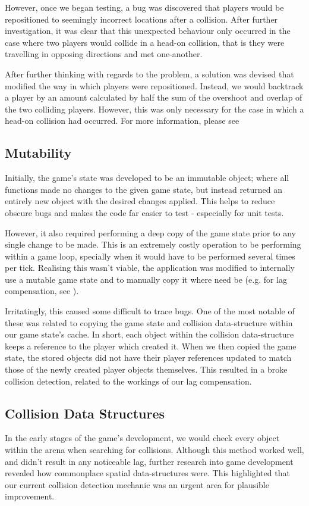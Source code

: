 \documentclass{standalone}
\begin{document}
			However, once we began testing, a bug was discovered that players would be repositioned to seemingly incorrect locations after a collision. After further investigation, it was clear that this unexpected behaviour only occurred in the case where two players would collide in a head-on collision, that is they were travelling in opposing directions and met one-another.

			After further thinking with regards to the problem, a solution was devised that modified the way in which players were repositioned. Instead, we would backtrack a player by an amount calculated by half the sum of the overshoot and overlap of the two colliding players. However, this was only necessary for the case in which a head-on collision had occurred. For more information, please see 

		\subsection{Mutability}
			Initially, the game's state was developed to be an immutable object; where all functions made no changes to the given game state, but instead returned an entirely new object with the desired changes applied. This helps to reduce obscure bugs and makes the code far easier to test - especially for unit tests.

			However, it also required performing a deep copy of the game state prior to any single change to be made. This is an extremely costly operation to be performing within a game loop, specially when it would have to be performed several times per tick. Realising this wasn't viable, the application was modified to internally use a mutable game state and to manually copy it where need be (e.g. for lag compensation, see ).

			Irritatingly, this caused some difficult to trace bugs. One of the most notable of these was related to copying the game state and collision data-structure within our game state's cache. In short, each object within the collision data-structure keeps a reference to the player which created it. When we then copied the game state, the stored objects did not have their player references updated to match those of the newly created player objects themselves. This resulted in a broke collision detection, related to the workings of our lag compensation.

		\subsection{Collision Data Structures}
			In the early stages of the game's development, we would check every object within the arena when searching for collisions. Although this method worked well, and didn't result in any noticeable lag, further research into game development revealed how commonplace spatial data-structures were. This highlighted that our current collision detection mechanic was an urgent area for plausible improvement.
\end{document}
